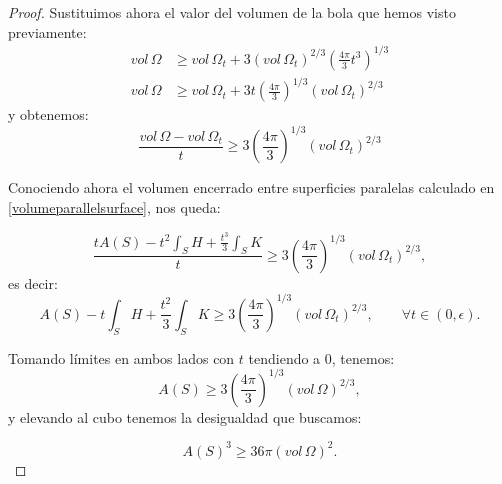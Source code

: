 \begin{proof}
Sustituimos ahora el valor del volumen de la bola que hemos visto previamente:
%
\begin{align*}
    vol \, \Omega &\geq vol \, \Omega_t + 3(vol \, \Omega_t)^{2/3} \left( \frac{4\pi}{3}t^3 \right)^{1/3} \\
    vol \, \Omega &\geq vol \, \Omega_t + 3t \left( \frac{4\pi}{3} \right)^{1/3} (vol \, \Omega_t)^{2/3}
\end{align*}
%
y obtenemos:
%
\begin{equation*}
    \frac{vol \, \Omega - vol \, \Omega_t}{t} \geq 3 \left( \frac{4\pi}{3} \right)^{1/3} (vol \, \Omega_t)^{2/3}
\end{equation*}

Conociendo ahora el volumen encerrado entre superficies paralelas calculado en \ref{volumeparallelsurface}, nos queda:

\begin{equation*}
    \frac{tA(S) - t^2\int_S H + \frac{t^3}{3}\int_S K}{t} \geq 3 \left( \frac{4\pi}{3} \right)^{1/3} (vol \, \Omega_t)^{2/3},
\end{equation*}
%
es decir:
%
\begin{equation*}
    A(S) - t\int_S H + \frac{t^2}{3}\int_S K \geq 3 \left( \frac{4\pi}{3} \right)^{1/3} (vol \, \Omega_t)^{2/3}, \qquad \forall t \in (0,\epsilon).
\end{equation*}

Tomando límites en ambos lados con $t$ tendiendo a $0$, tenemos:
%
\begin{equation*}
    A(S) \geq 3 \left( \frac{4\pi}{3} \right)^{1/3} (vol \, \Omega)^{2/3},
\end{equation*}
%
y elevando al cubo tenemos la desigualdad que buscamos:

\begin{equation*}
    A(S)^3 \geq 36\pi(vol \, \Omega)^2.
\end{equation*}
\end{proof}

